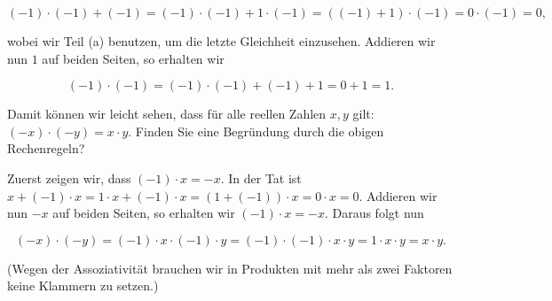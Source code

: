 \documentclass{ximera}
\begin{document}
\[
(-1)\cdot (-1) + (-1) = (-1)\cdot (-1) + 1\cdot (-1) = ((-1)+1) \cdot (-1) = 0\cdot (-1) = 0,
\]

wobei wir Teil (a) benutzen, um die letzte Gleichheit einzusehen.
Addieren wir nun $1$ auf beiden Seiten, so erhalten wir

\[
(-1)\cdot (-1) = (-1)\cdot (-1) + (-1) + 1 = 0+1= 1.
\]

\begin{exercise}
Damit können wir leicht sehen, dass für alle reellen Zahlen $x,y$ gilt: $(-x)\cdot (-y) = x\cdot y$. Finden Sie eine Begründung durch die obigen Rechenregeln?
\begin{solution}
\begin{free-response}
Zuerst zeigen wir, dass $(-1)\cdot x = -x$. In der Tat ist $x + (-1)\cdot x = 1\cdot x + (-1)\cdot x = (1+(-1))\cdot x = 0\cdot x = 0$. Addieren wir nun $-x$ auf beiden Seiten, so erhalten wir $(-1)\cdot x = -x$.
Daraus folgt nun

\[
(-x)\cdot (-y) = (-1)\cdot x \cdot (-1) \cdot y = (-1)\cdot (-1)\cdot x\cdot y = 1\cdot x\cdot y = x\cdot y.
\]

(Wegen der Assoziativität brauchen wir in Produkten mit mehr als zwei Faktoren keine Klammern zu setzen.)
\end{free-response}
\end{solution}
\end{exercise}
\end{document}
